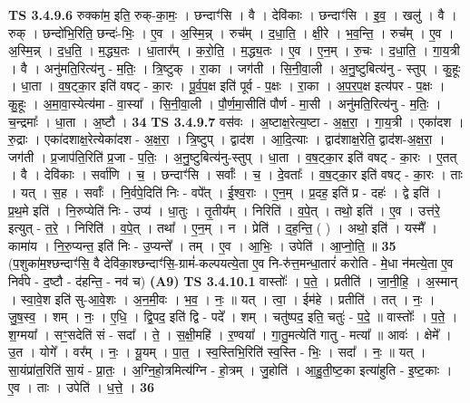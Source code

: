 \documentclass[17pt]{extarticle}
\begin{document}
                  \newline
                                \textbf{ TS 3.4.9.6} \newline
                  रुक्का॑म॒ इति॒ रुक्-का॒मः॒ । छन्दाꣳ॑सि । वै । देवि॑काः । छन्दाꣳ॑सि । इ॒व॒ । खलु॑ । वै । रुक् । छन्दो॑भि॒रिति॒ छन्दः॑-भिः॒ । ए॒व । अ॒स्मि॒न्न् । रुच᳚म् । द॒धा॒ति॒ । क्षी॒रे । भ॒व॒न्ति॒ । रुच᳚म् । ए॒व । अ॒स्मि॒न्न् । द॒ध॒ति॒ । म॒द्ध्य॒तः । धा॒तार᳚म् । क॒रो॒ति॒ । म॒द्ध्य॒तः । ए॒व । ए॒न॒म् । रु॒चः । द॒धा॒ति॒ । गा॒य॒त्री । वै । अनु॑मति॒रित्य॑नु - म॒तिः॒ । त्रि॒ष्टुक् । रा॒का । जग॑ती । सि॒नी॒वा॒ली । अ॒नु॒ष्टुबित्य॑नु - स्तुप् । कु॒हूः । धा॒ता । व॒ष॒ट्का॒र इति॑ वषट् - का॒रः । पू॒र्व॒प॒क्ष इति॑ पूर्व - प॒क्षः । रा॒का । अ॒प॒र॒प॒क्ष इत्य॑पर - प॒क्षः । कु॒हूः । अ॒मा॒वा॒स्येत्य॑मा - वा॒स्या᳚ । सि॒नी॒वा॒ली । पौ॒र्ण॒मा॒सीति॑ पौर्ण - मा॒सी । अनु॑मति॒रित्य॑नु - म॒तिः॒ । च॒न्द्रमाः᳚ । धा॒ता । अ॒ष्टौ । \textbf{  34} \newline
                  \newline
                                \textbf{ TS 3.4.9.7} \newline
                  वस॑वः । अ॒ष्टाक्ष॒रेत्य॒ष्टा - अ॒क्ष॒रा॒ । गा॒य॒त्री । एका॑दश । रु॒द्राः । एका॑दशाक्ष॒रेत्येका॑दश - अ॒क्ष॒रा॒ । त्रि॒ष्टुप् । द्वाद॑श । आ॒दि॒त्याः । द्वाद॑शाक्ष॒रेति॒ द्वाद॑श-अ॒क्ष॒रा॒ । जग॑ती । प्र॒जाप॑ति॒रिति॑ प्र॒जा - प॒तिः॒ । अ॒नु॒ष्टुबित्य॑नु-स्तुप् । धा॒ता । व॒ष॒ट्का॒र इति॑ वषट् - का॒रः । ए॒तत् । वै । देवि॑काः । सर्वा॑णि । च॒ । छन्दाꣳ॑सि । सर्वाः᳚ । च॒ । दे॒वताः᳚ । व॒ष॒ट्का॒र इति॑ वषट् - का॒रः । ताः । यत् । स॒ह । सर्वाः᳚ । नि॒र्वपे॒दिति॑ निः - वपे᳚त् । ई॒श्व॒राः । ए॒न॒म् । प्र॒दह॒ इति॑ प्र - दहः॑ । द्वे इति॑ । प्र॒थ॒मे इति॑ । नि॒रुप्येति॑ निः - उप्य॑ । धा॒तुः । तृ॒तीय᳚म् । निरिति॑ । व॒पे॒त् । तथो॒ इति॑ । ए॒व । उत्त॑रे॒ इत्युत् - त॒रे॒ । निरिति॑ । व॒पे॒त् । तथा᳚ । ए॒न॒म् । न । प्रेति॑ । द॒ह॒न्ति॒ ( ) । अथो॒ इति॑ । यस्मै᳚ । कामा॑य । नि॒रु॒प्यन्त॒ इति॑ निः - उ॒प्यन्ते᳚ । तम् । ए॒व । आ॒भिः॒ । उपेति॑ । आ॒प्नो॒ति॒ ॥ \textbf{  35} \newline
                  \newline
                      (प॒शुका॑म॒श्छन्दाꣳ॑सि॒ वै देवि॑का॒श्छन्दाꣳ॑सि॒-ग्रामं॑-कल्पयत्ये॒ता ए॒व नि-रु॑त्त॒मन्धा॒तारं॑ करोति - मे॒धा न॑मत्ये॒ता ए॒व निर्व॑पे - द॒ष्टौ - द॑हन्ति॒ - नव॑ च)  \textbf{(A9)} \newline \newline
                                \textbf{ TS 3.4.10.1} \newline
                  वास्तोः᳚ । प॒ते॒ । प्रतीति॑ । जा॒नी॒हि॒ । अ॒स्मान् । स्वा॒वे॒श इति॑ सु-आ॒वे॒शः । अ॒न॒मी॒वः । भ॒व॒ । नः॒ ॥ यत् । त्वा॒ । ईम॑हे । प्रतीति॑ । तत् । नः॒ । जु॒ष॒स्व॒ । शम् । नः॒ । ए॒धि॒ । द्वि॒पद॒ इति॑ द्वि - पदे᳚ । शम् । चतु॑ष्पद॒ इति॒ चतुः॑ - प॒दे॒ ॥ वास्तोः᳚ । प॒ते॒ । श॒ग्मया᳚ । सꣳ॒॒सदेति॑ सं - सदा᳚ । ते॒ । स॒क्षी॒महि॑ । र॒ण्वया᳚ । गा॒तु॒मत्येति॑ गातु - मत्या᳚ ॥ आवः॑ । क्षेमे᳚ । उ॒त । योगे᳚ । वर᳚म् । नः॒ । यू॒यम् । पा॒त॒ । स्व॒स्तिभि॒रिति॑ स्व॒स्ति - भिः॒ । सदा᳚ । नः॒ ॥ यत् । सा॒यंप्रा॑त॒रिति॑ सा॒यं - प्रा॒तः॒ । अ॒ग्नि॒हो॒त्रमित्य॑ग्नि - हो॒त्रम् । जु॒होति॑ । आ॒हु॒ती॒ष्ट॒का इत्या॑हुति - इ॒ष्ट॒काः । ए॒व । ताः । उपेति॑ । ध॒त्ते॒ । \textbf{  36} \newline
\end{document}
